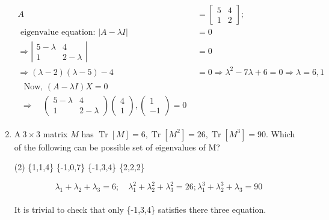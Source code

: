 \begin{enumerate}[label=\color{ocre}\textbf{\arabic*.}]
\begin{tasks}
\end{tasks}
\begin{answer}
\begin{align*}
A&=\left[\begin{array}{ll}
5 & 4 \\
1 & 2
\end{array}\right] ;\\ \text { eigenvalue equation: }|A-\lambda I|&=0\\
\Rightarrow\left|\begin{array}{cc}
5-\lambda & 4 \\
1 & 2-\lambda
\end{array}\right|&=0 \quad\\ \Rightarrow(\lambda-2)(\lambda-5)-4&=0 \Rightarrow \lambda^{2}-7 \lambda+6=0 \Rightarrow \lambda=6,1\\
\begin{array}{l}
\text { Now, }(A-\lambda I) X=0 \\
\Rightarrow \quad\left(\begin{array}{cc}
5-\lambda & 4 \\
1 & 2-\lambda
\end{array}\right)\left(\begin{array}{c}4 \\ 1\end{array}\right),\left(\begin{array}{c}1 \\ -1\end{array}\right)=0
\end{array}
\end{align*}	
\end{answer}
\item $ \mathrm{A}\  3 \times 3$ matrix $M$ has $\operatorname{Tr}[M]=6, \operatorname{Tr}\left[M^{2}\right]=26, \operatorname{Tr}\left[M^{3}\right]=90 .$ Which of the following can be possible set of eigenvalues of M?
\begin{tasks}(2)
	\task[\textbf{a.}]\{1,1,4\}  
	\task[\textbf{b.}]\{-1,0,7\}
	\task[\textbf{c.}] \{-1,3,4\} 
	\task[\textbf{d.}]\{2,2,2\} 
\end{tasks}
\begin{answer}
$$\lambda_{1}+\lambda_{2}+\lambda_{3}=6 ; \quad \lambda_{1}^{2}+\lambda_{2}^{2}+\lambda_{3}^{2}=26 ; \lambda_{1}^{3}+\lambda_{2}^{3}+\lambda_{3}=90$$
\\It is trivial to check that only \{-1,3,4\} satisfies there three equation.	
\end{answer}

\end{enumerate}

